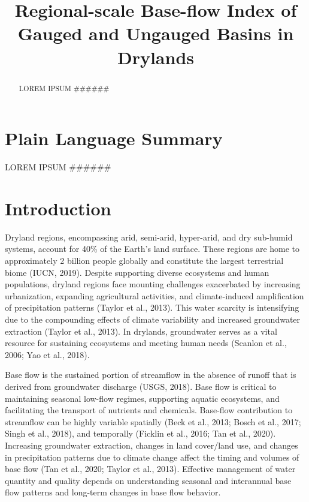 \documentclass[
]{agujournal2019}
\begin{document}
\title{Regional-scale Base-flow Index of Gauged and Ungauged Basins in
Drylands}



\begin{abstract}
LOREM IPSUM \#\#\#\#\#\#
\end{abstract}

\section*{Plain Language Summary}
LOREM IPSUM \#\#\#\#\#\#




\section{Introduction}\label{sec-intro}

Dryland regions, encompassing arid, semi-arid, hyper-arid, and dry
sub-humid systems, account for 40\% of the Earth's land surface. These
regions are home to approximately 2 billion people globally and
constitute the largest terrestrial biome (IUCN, 2019). Despite
supporting diverse ecosystems and human populations, dryland regions
face mounting challenges exacerbated by increasing urbanization,
expanding agricultural activities, and climate-induced amplification of
precipitation patterns (Taylor et al., 2013). This water scarcity is
intensifying due to the compounding effects of climate variability and
increased groundwater extraction (Taylor et al., 2013). In drylands,
groundwater serves as a vital resource for sustaining ecosystems and
meeting human needs (Scanlon et al., 2006; Yao et al., 2018).

Base flow is the sustained portion of streamflow in the absence of
runoff that is derived from groundwater discharge (USGS, 2018). Base
flow is critical to maintaining seasonal low-flow regimes, supporting
aquatic ecosystems, and facilitating the transport of nutrients and
chemicals. Base-flow contribution to streamflow can be highly variable
spatially (Beck et al., 2013; Bosch et al., 2017; Singh et al., 2018),
and temporally (Ficklin et al., 2016; Tan et al., 2020). Increasing
groundwater extraction, changes in land cover/land use, and changes in
precipitation patterns due to climate change affect the timing and
volumes of base flow (Tan et al., 2020; Taylor et al., 2013). Effective
management of water quantity and quality depends on understanding
seasonal and interannual base flow patterns and long-term changes in
base flow behavior.
\end{document}
